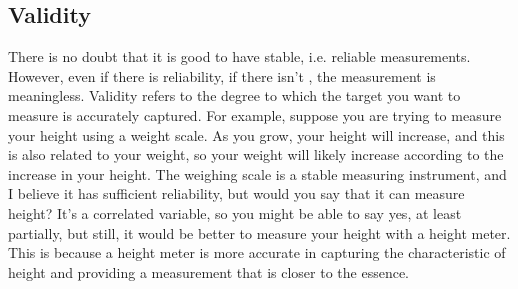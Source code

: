 \documentclass{ltjbook}
\begin{document}
\subsection{Validity}
There is no doubt that it is good to have stable, i.e. reliable measurements. However, even if there is reliability, if there isn't , the measurement is meaningless. Validity refers to the degree to which the target you want to measure is accurately captured.
For example, suppose you are trying to measure your height using a weight scale. As you grow, your height will increase, and this is also related to your weight, so your weight will likely increase according to the increase in your height. The weighing scale is a stable measuring instrument, and I believe it has sufficient reliability, but would you say that it can measure height? It's a correlated variable, so you might be able to say yes, at least partially, but still, it would be better to measure your height with a height meter. This is because a height meter is more accurate in capturing the characteristic of height and providing a measurement that is closer to the essence.
\end{document}
